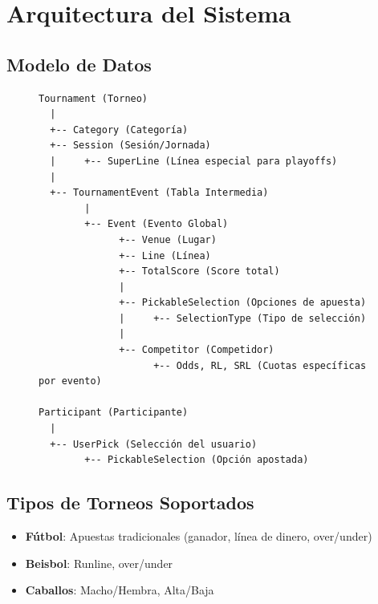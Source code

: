 \documentclass[12pt,a4paper]{article}
\begin{document}
\newpage

\section{Arquitectura del Sistema}

\subsection{Modelo de Datos}

\begin{figure}[h]
\centering
\begin{verbatim}
Tournament (Torneo)
  |
  +-- Category (Categoría)
  +-- Session (Sesión/Jornada)
  |     +-- SuperLine (Línea especial para playoffs)
  |
  +-- TournamentEvent (Tabla Intermedia)
        |
        +-- Event (Evento Global)
              +-- Venue (Lugar)
              +-- Line (Línea)
              +-- TotalScore (Score total)
              |
              +-- PickableSelection (Opciones de apuesta)
              |     +-- SelectionType (Tipo de selección)
              |
              +-- Competitor (Competidor)
                    +-- Odds, RL, SRL (Cuotas específicas por evento)
                    
Participant (Participante)
  |
  +-- UserPick (Selección del usuario)
        +-- PickableSelection (Opción apostada)
\end{verbatim}
\end{figure}

\subsection{Tipos de Torneos Soportados}
\begin{itemize}
    \item \textbf{Fútbol}: Apuestas tradicionales (ganador, línea de dinero, over/under)
    \item \textbf{Beisbol}: Runline, over/under
    \item \textbf{Caballos}: Macho/Hembra, Alta/Baja
\end{itemize}
\end{document}

